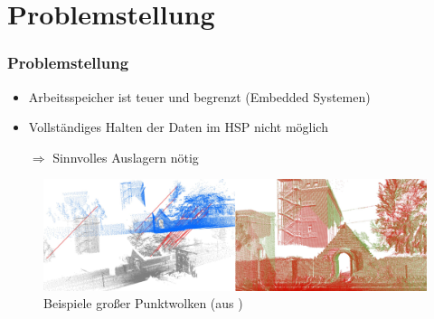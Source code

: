 \documentclass[presentation]{beamer}
\begin{document}
\section{Problemstellung} 
\begin{frame}
	\frametitle{Problemstellung}
	\begin{itemize}
		\item Arbeitsspeicher ist teuer und begrenzt (Embedded Systemen)
		\item Vollständiges Halten der Daten im HSP nicht möglich
		\item [$\Rightarrow$] Sinnvolles Auslagern nötig
	\end{itemize}
	\begin{figure}
	\includegraphics[width=1\linewidth]{figures/introduction/registration_combined.png}
	\caption{Beispiele großer Punktwolken (aus \cite{PCLReg})}
	\end{figure} 
\end{frame}
\end{document}
